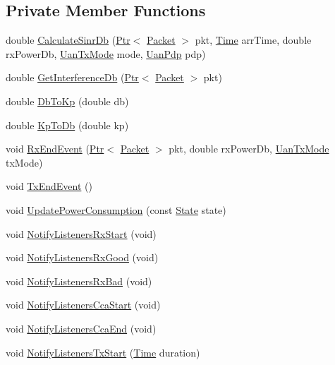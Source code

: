\subsection*{Private Member Functions}
\begin{DoxyCompactItemize}
\item 
double \hyperlink{classns3_1_1UanPhyGen_a8ee7b3cf1d4971c3b2ca718282bb238b}{Calculate\+Sinr\+Db} (\hyperlink{classns3_1_1Ptr}{Ptr}$<$ \hyperlink{classns3_1_1Packet}{Packet} $>$ pkt, \hyperlink{classns3_1_1Time}{Time} arr\+Time, double rx\+Power\+Db, \hyperlink{classns3_1_1UanTxMode}{Uan\+Tx\+Mode} mode, \hyperlink{classns3_1_1UanPdp}{Uan\+Pdp} pdp)
\item 
double \hyperlink{classns3_1_1UanPhyGen_a8c991401463b00f7daaf3c3486f6bf1b}{Get\+Interference\+Db} (\hyperlink{classns3_1_1Ptr}{Ptr}$<$ \hyperlink{classns3_1_1Packet}{Packet} $>$ pkt)
\item 
double \hyperlink{classns3_1_1UanPhyGen_ab83a534db06cec2f505881f10df8e998}{Db\+To\+Kp} (double db)
\item 
double \hyperlink{classns3_1_1UanPhyGen_a110f8bc6e30578784ce3abd15215b94b}{Kp\+To\+Db} (double kp)
\item 
void \hyperlink{classns3_1_1UanPhyGen_ad25812a8416a7441e4f909d52e13745e}{Rx\+End\+Event} (\hyperlink{classns3_1_1Ptr}{Ptr}$<$ \hyperlink{classns3_1_1Packet}{Packet} $>$ pkt, double rx\+Power\+Db, \hyperlink{classns3_1_1UanTxMode}{Uan\+Tx\+Mode} tx\+Mode)
\item 
void \hyperlink{classns3_1_1UanPhyGen_abcecb83f345e810a8ee8b2a604097037}{Tx\+End\+Event} ()
\item 
void \hyperlink{classns3_1_1UanPhyGen_a3a50f922b45744f8586b2d2c95090076}{Update\+Power\+Consumption} (const \hyperlink{classns3_1_1UanPhy_afc5e3b6b00589131e4a56ececd42bf9f}{State} state)
\item 
void \hyperlink{classns3_1_1UanPhyGen_a0d5a5619d5fb96d0ee929903992a4f99}{Notify\+Listeners\+Rx\+Start} (void)
\item 
void \hyperlink{classns3_1_1UanPhyGen_af15506ea55094bb50c8f73e8fff38399}{Notify\+Listeners\+Rx\+Good} (void)
\item 
void \hyperlink{classns3_1_1UanPhyGen_aadf3344bc84baa37fee5646f2840412d}{Notify\+Listeners\+Rx\+Bad} (void)
\item 
void \hyperlink{classns3_1_1UanPhyGen_a8f5614c856c43db7cf91a83e9e8506e9}{Notify\+Listeners\+Cca\+Start} (void)
\item 
void \hyperlink{classns3_1_1UanPhyGen_affeb14a6054061b34e8953c381d3dc41}{Notify\+Listeners\+Cca\+End} (void)
\item 
void \hyperlink{classns3_1_1UanPhyGen_a3250312e2ea68cbeb80cc42f4f48f537}{Notify\+Listeners\+Tx\+Start} (\hyperlink{classns3_1_1Time}{Time} duration)
\end{DoxyCompactItemize}
